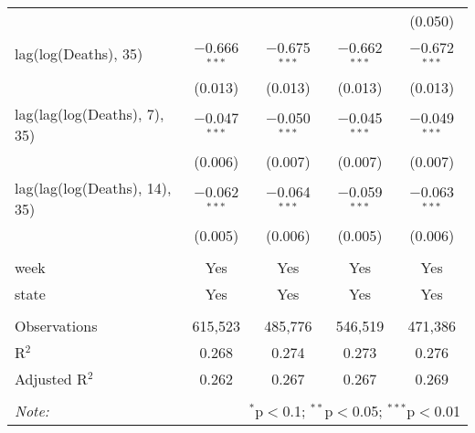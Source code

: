 \begin{tabular}{@{\extracolsep{1pt}}lcccc}
  &  &  &  & (0.050) \\ 
  lag(log(Deaths), 35) & $-$0.666$^{***}$ & $-$0.675$^{***}$ & $-$0.662$^{***}$ & $-$0.672$^{***}$ \\ 
  & (0.013) & (0.013) & (0.013) & (0.013) \\ 
  lag(lag(log(Deaths), 7), 35) & $-$0.047$^{***}$ & $-$0.050$^{***}$ & $-$0.045$^{***}$ & $-$0.049$^{***}$ \\ 
  & (0.006) & (0.007) & (0.007) & (0.007) \\ 
  lag(lag(log(Deaths), 14), 35) & $-$0.062$^{***}$ & $-$0.064$^{***}$ & $-$0.059$^{***}$ & $-$0.063$^{***}$ \\ 
  & (0.005) & (0.006) & (0.005) & (0.006) \\ 
 \hline \\[-1.8ex] 
week & Yes & Yes & Yes & Yes \\ 
state & Yes & Yes & Yes & Yes \\ 
\hline \\[-1.8ex] 
Observations & 615,523 & 485,776 & 546,519 & 471,386 \\ 
R$^{2}$ & 0.268 & 0.274 & 0.273 & 0.276 \\ 
Adjusted R$^{2}$ & 0.262 & 0.267 & 0.267 & 0.269 \\ 
\hline 
\hline \\[-1.8ex] 
\textit{Note:}  & \multicolumn{4}{r}{$^{*}$p$<$0.1; $^{**}$p$<$0.05; $^{***}$p$<$0.01} \\ 
\end{tabular} 